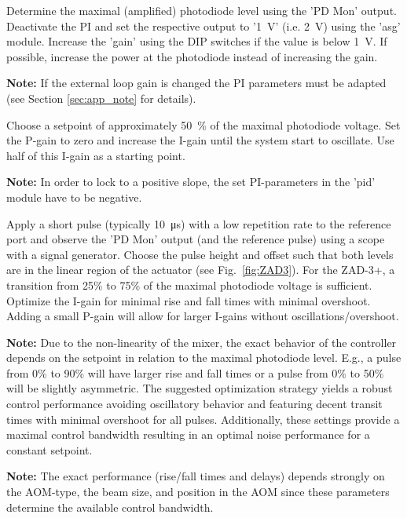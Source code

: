 \documentclass[twoside,a4paper]{refart}
\begin{document}
Determine the maximal (amplified) photodiode level using the 'PD Mon' output. Deactivate the PI and set the respective output to '\SI{1}{\volt}' (i.e. \SI{2}{\volt}) using the 'asg' module. Increase the 'gain' using the DIP switches if the value is below \SI{1}{\volt}. If possible, increase the power at the photodiode instead of increasing the gain. 

\textbf{Note:}
If the external loop gain is changed the PI parameters must be adapted (see Section \ref{sec:app_note} for details).

Choose a setpoint of approximately \SI{50}{\percent} of the maximal photodiode voltage. Set the P-gain to zero and increase the I-gain until the system start to oscillate. Use half of this I-gain as a starting point.

\textbf{Note:}
In order to lock to a positive slope, the set PI-parameters in the 'pid' module have to be negative.

Apply a short pulse (typically \SI{10}{\micro\second}) with a low repetition rate to the reference port and observe the 'PD Mon' output (and the reference pulse) using a scope with a signal generator. Choose the pulse height and offset such that both levels are in the linear region of the actuator (see Fig.~\ref{fig:ZAD3}). For the ZAD-3+, a transition from 25\% to 75\% of the maximal photodiode voltage is sufficient. Optimize the I-gain for minimal rise and fall times with minimal overshoot. Adding a small P-gain will allow for larger I-gains without oscillations/overshoot.

\textbf{Note:}
Due to the non-linearity of the mixer, the exact behavior of the controller depends on the setpoint in relation to the maximal photodiode level. E.g., a pulse from 0\% to 90\% will have larger rise and fall times or a pulse from 0\% to 50\% will be slightly asymmetric. The suggested optimization strategy yields a robust control performance avoiding oscillatory behavior and featuring decent transit times with minimal overshoot for all pulses. Additionally, these settings provide a maximal control bandwidth resulting in an optimal noise performance for a constant setpoint.

\textbf{Note:}
The exact performance (rise/fall times and delays) depends strongly on the AOM-type, the beam size, and position in the AOM since these parameters determine the available control bandwidth.          
\newpage
\end{document}
